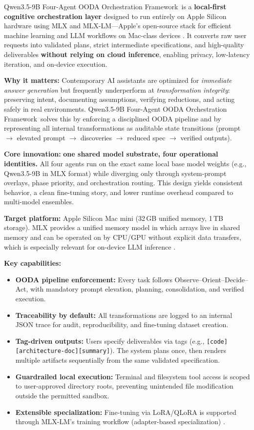 \documentclass[11pt]{article}
\newcommand{\FrameworkName}{Qwen3.5-9B Four-Agent OODA Orchestration Framework}
\newcommand{\TargetHardware}{Apple Silicon Mac mini (32\,GB unified memory, 1\,TB storage)}
\begin{document}
\FrameworkName\ is a \textbf{local-first cognitive orchestration layer} designed to run entirely on Apple Silicon hardware using MLX and MLX-LM---Apple's open-source stack for efficient machine learning and LLM workflows on Mac-class devices \cite{MLX_GitHub, MLX_Docs, MLXLM_Readme}.
It converts raw user requests into validated plans, strict intermediate specifications, and high-quality deliverables \textbf{without relying on cloud inference}, enabling privacy, low-latency iteration, and on-device execution.

\begin{InvestorBox}
\textbf{Why it matters:} Contemporary AI assistants are optimized for \emph{immediate answer generation} but frequently underperform at \emph{transformation integrity}: preserving intent, documenting assumptions, verifying reductions, and acting safely in real environments.
\FrameworkName\ solves this by enforcing a disciplined OODA pipeline and by representing all internal transformations as auditable state transitions (prompt $\rightarrow$ elevated prompt $\rightarrow$ discoveries $\rightarrow$ reduced spec $\rightarrow$ verified outputs).
\end{InvestorBox}

\noindent\textbf{Core innovation:} \textbf{one shared model substrate, four operational identities.}
All four agents run on the exact same local base model weights (e.g., Qwen3.5-9B in MLX format) while diverging only through system-prompt overlays, phase priority, and orchestration routing.
This design yields consistent behavior, a clean fine-tuning story, and lower runtime overhead compared to multi-model ensembles.

\noindent\textbf{Target platform:} \TargetHardware.
MLX provides a unified memory model in which arrays live in shared memory and can be operated on by CPU/GPU without explicit data transfers, which is especially relevant for on-device LLM inference \cite{MLX_GitHub, MLX_Docs}.

\noindent\textbf{Key capabilities:}
\begin{itemize}
  \item \textbf{OODA pipeline enforcement:} Every task follows Observe--Orient--Decide--Act, with mandatory prompt elevation, planning, consolidation, and verified execution.
  \item \textbf{Traceability by default:} All transformations are logged to an internal JSON trace for audit, reproducibility, and fine-tuning dataset creation.
  \item \textbf{Tag-driven outputs:} Users specify deliverables via tags (e.g., \texttt{[code][architecture-doc][summary]}). The system plans once, then renders multiple artifacts sequentially from the same validated specification.
  \item \textbf{Guardrailed local execution:} Terminal and filesystem tool access is scoped to user-approved directory roots, preventing unintended file modification outside the permitted sandbox.
  \item \textbf{Extensible specialization:} Fine-tuning via LoRA/QLoRA is supported through MLX-LM's training workflow (adapter-based specialization) \cite{MLXLM_LoRA}.
\end{itemize}
\end{document}
